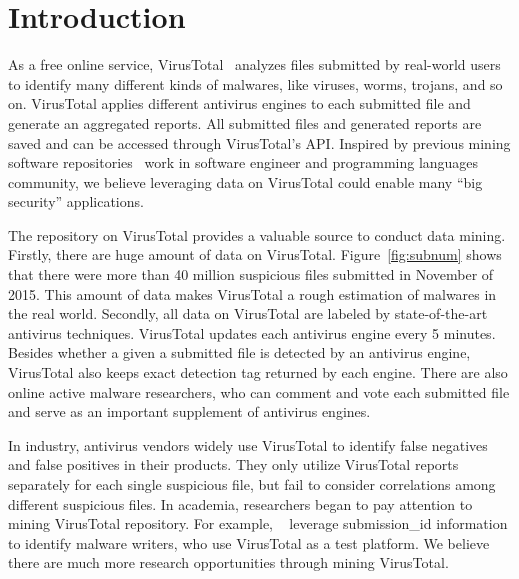\section{Introduction}

As a free online service, VirusTotal~\cite{virustotal} analyzes files submitted by real-world users to identify many different kinds of malwares, 
like viruses, worms, trojans, and so on. 
VirusTotal applies different antivirus engines to each submitted file and generate an aggregated reports. 
All submitted files and generated reports are saved and can be accessed through VirusTotal’s API. 
Inspired by previous mining software repositories~\cite{GuoICSE2010,bigcode, big-lessons,big-translation,code-completion,big-predicting} 
work in software engineer and programming languages community, 
we believe leveraging data on VirusTotal could enable many ``big security'' applications.  

The repository on VirusTotal provides a valuable source to conduct data mining. 
Firstly, there are huge amount of data on VirusTotal.
Figure~\ref{fig:subnum} shows that there were more than 40 million suspicious files 
submitted in November of 2015. 
This amount of data makes VirusTotal a rough estimation of malwares in the real world. 
Secondly, all data on VirusTotal are labeled by state-of-the-art antivirus techniques. 
VirusTotal updates each antivirus engine every 5 minutes. 
Besides whether a given a submitted file is detected by an antivirus engine, VirusTotal also keeps exact detection tag returned by each engine. 
There are also online active malware researchers, 
who can comment and vote each submitted file 
and serve as an important supplement of antivirus engines. 

In industry, antivirus vendors widely use VirusTotal to identify false negatives 
and false positives in their products. 
They only utilize VirusTotal reports separately for each single suspicious file, 
but fail to consider correlations among different suspicious files. 
In academia, researchers began to pay attention to mining VirusTotal repository. 
For example, ~\citet{neeles} leverage submission\_id information to identify malware writers, 
who use VirusTotal as a test platform. 
We believe there are much more research opportunities through mining VirusTotal. 

